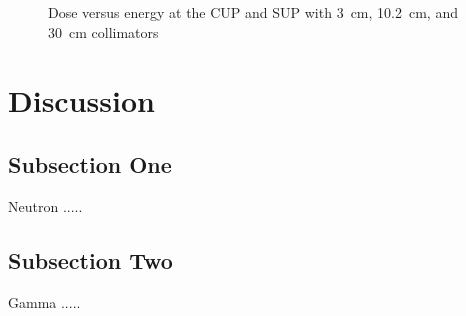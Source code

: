 \documentclass[12pt,journal]{IEEEtran}
\let\MYoriglatexcaption\caption
\renewcommand{\caption}[2][\relax]{\MYoriglatexcaption[#2]{#2}}
\begin{document}
\begin{figure}[!t]
	\centering
	\hfil
	\caption{Dose versus energy at the CUP and SUP with \SI{3}{\cm}, \SI{10.2}{\cm}, and \SI{30}{\cm} collimators}
	\label{fig:DoseVSenergy}
\end{figure}

\section{Discussion}

\subsection{Subsection One}

Neutron .....

\subsection{Subsection Two}

Gamma .....

\end{document}
